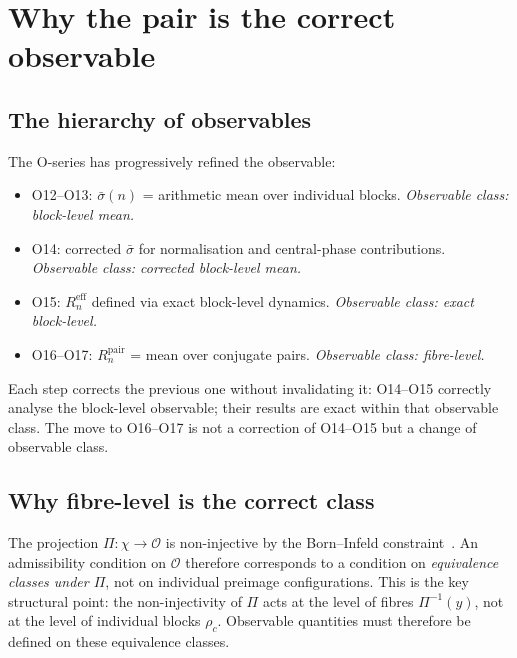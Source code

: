 \documentclass[11pt,a4paper]{article}
\theoremstyle{definition}
\begin{document}
  \section{Why the pair is the correct observable}
    \label{sec:why_pair}

    \subsection{The hierarchy of observables}

      The O-series has progressively refined the observable:

      \begin{itemize}
        \item O12--O13: $\bar\sigma(n)$ = arithmetic mean over individual blocks.
        \emph{Observable class: block-level mean.}
        \item O14: corrected $\bar\sigma$ for normalisation and central-phase
        contributions. \emph{Observable class: corrected block-level mean.}
        \item O15: $R_n^{\mathrm{eff}}$ defined via exact block-level dynamics.
        \emph{Observable class: exact block-level.}
        \item O16--O17: $R_n^{\mathrm{pair}}$ = mean over conjugate pairs.
        \emph{Observable class: fibre-level.}
      \end{itemize}

      Each step corrects the previous one without invalidating it:
      O14--O15 correctly analyse the block-level observable;
      their results are exact within that observable class.
      The move to O16--O17 is not a correction of O14--O15 but
      a change of observable class.

    \subsection{Why fibre-level is the correct class}

      The projection $\Pi : \chi \to \mathcal{O}$ is non-injective by
      the Born--Infeld constraint~\cite{Beau2026a2}.
      An admissibility condition on $\mathcal{O}$ therefore corresponds
      to a condition on \emph{equivalence classes under $\Pi$}, not
      on individual preimage configurations.
      This is the key structural point: the non-injectivity of $\Pi$
      acts at the level of fibres $\Pi^{-1}(y)$, not at the level of
      individual blocks $\rho_c$.
      Observable quantities must therefore be defined on these
      equivalence classes.
\end{document}
